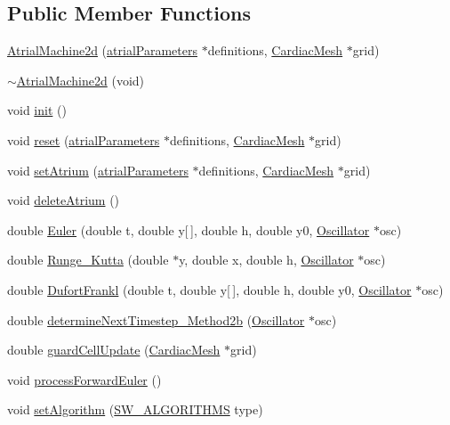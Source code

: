 \subsection*{Public Member Functions}
\begin{DoxyCompactItemize}
\item 
\hyperlink{class_atrial_machine2d_a1181b8a58b70e0374cfaefcbf2c29b12}{Atrial\+Machine2d} (\hyperlink{classatrial_parameters}{atrial\+Parameters} $\ast$definitions, \hyperlink{class_cardiac_mesh}{Cardiac\+Mesh} $\ast$grid)
\item 
\hyperlink{class_atrial_machine2d_a955b6614307d86c8d9e196a3b7ce2434}{$\sim$\+Atrial\+Machine2d} (void)
\item 
void \hyperlink{class_atrial_machine2d_a22a0e5a3d07859721cce24ed253932ed}{init} ()
\item 
void \hyperlink{class_atrial_machine2d_ad8d65bd2e62e26fd620a21f4f6fbd184}{reset} (\hyperlink{classatrial_parameters}{atrial\+Parameters} $\ast$definitions, \hyperlink{class_cardiac_mesh}{Cardiac\+Mesh} $\ast$grid)
\item 
void \hyperlink{class_atrial_machine2d_a80f97d261da5f2ca116592b07455425a}{set\+Atrium} (\hyperlink{classatrial_parameters}{atrial\+Parameters} $\ast$definitions, \hyperlink{class_cardiac_mesh}{Cardiac\+Mesh} $\ast$grid)
\item 
void \hyperlink{class_atrial_machine2d_a40366613671e5856d0c3cd0572398dc1}{delete\+Atrium} ()
\item 
double \hyperlink{class_atrial_machine2d_a9cd5c318f2021169ee6a28ca27ff6924}{Euler} (double t, double y\mbox{[}$\,$\mbox{]}, double h, double y0, \hyperlink{class_oscillator}{Oscillator} $\ast$osc)
\item 
double \hyperlink{class_atrial_machine2d_a2d181080d4da8598ce58dc29d3ee707a}{Runge\+\_\+\+Kutta} (double $\ast$y, double x, double h, \hyperlink{class_oscillator}{Oscillator} $\ast$osc)
\item 
double \hyperlink{class_atrial_machine2d_af35ca9286dbe3f236b31ddd84f9d25e4}{Dufort\+Frankl} (double t, double y\mbox{[}$\,$\mbox{]}, double h, double y0, \hyperlink{class_oscillator}{Oscillator} $\ast$osc)
\item 
double \hyperlink{class_atrial_machine2d_afb0f7ee5a1efa0f20b1f3c145927374a}{determine\+Next\+Timestep\+\_\+\+Method2b} (\hyperlink{class_oscillator}{Oscillator} $\ast$osc)
\item 
double \hyperlink{class_atrial_machine2d_ad0cfe6a11b68c40c8db51da0a4ccb4cb}{guard\+Cell\+Update} (\hyperlink{class_cardiac_mesh}{Cardiac\+Mesh} $\ast$grid)
\item 
void \hyperlink{class_atrial_machine2d_aac348bf7321fae9fe7d8265f36e9d1e6}{process\+Forward\+Euler} ()
\item 
void \hyperlink{class_atrial_machine2d_aab1d925f08bbf319b374f6d2b879878b}{set\+Algorithm} (\hyperlink{heart_defines_8h_ae0e356ca8deebb30aca0cd91e0cbd46c}{S\+W\+\_\+\+A\+L\+G\+O\+R\+I\+T\+H\+M\+S} type)
\end{DoxyCompactItemize}
